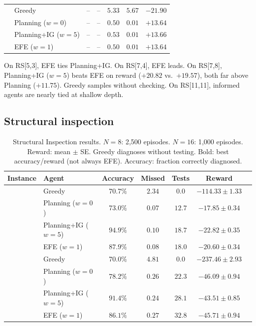 \documentclass[runningheads]{llncs}
\begin{document}
\begin{table}[ht]
\begin{small}
\begin{tabular}{llccccc}
\midrule
{} & Greedy & -- & -- & $5.33$ & $5.67$ & $-21.90$ \\
& Planning ($w{=}0$) & -- & -- & $0.50$ & $0.01$ & $+13.64$ \\
& Planning+IG ($w{=}5$) & -- & -- & $0.53$ & $0.01$ & $\mathbf{+13.66}$ \\
& EFE ($w{=}1$) & -- & -- & $0.50$ & $0.01$ & $+13.64$ \\
\bottomrule
\end{tabular}
\end{small}
\end{table}

On RS[5,3], EFE ties Planning+IG. On RS[7,4], EFE leads. On RS[7,8], Planning+IG ($w{=}5$) beats EFE on reward ($+20.82$ vs.\ $+19.57$), both far above Planning ($+11.75$). Greedy samples without checking. On RS[11,11], informed agents are nearly tied at shallow depth.

\subsection{Structural inspection}
\label{sec:inspection}

\begin{table}[ht]
\centering
\caption{Structural Inspection results. $N{=}8$: 2{,}500 episodes. $N{=}16$: 1{,}000 episodes. Reward: mean $\pm$ SE. Greedy diagnoses without testing. Bold: best accuracy/reward (not always EFE). Accuracy: fraction correctly diagnosed.}
\label{tab:inspection}
\begin{small}
\begin{tabular}{llccccc}
\toprule
Instance & Agent & Accuracy & Missed & Tests & Reward \\
\midrule
{} & Greedy & 70.7\% & $2.34$ & $0.0$ & $-114.33 \pm 1.33$ \\
& Planning ($w{=}0$) & 73.0\% & $0.07$ & $12.7$ & $\mathbf{-17.85 \pm 0.34}$ \\
& Planning+IG ($w{=}5$) & $\mathbf{94.9\%}$ & $0.10$ & $18.7$ & $-22.82 \pm 0.35$ \\
& EFE ($w{=}1$) & $87.9\%$ & $0.08$ & $18.0$ & $-20.60 \pm 0.34$ \\
\midrule
{} & Greedy & 70.0\% & $4.81$ & $0.0$ & $-237.46 \pm 2.93$ \\
& Planning ($w{=}0$) & 78.2\% & $0.26$ & $22.3$ & $-46.09 \pm 0.94$ \\
& Planning+IG ($w{=}5$) & $\mathbf{91.4\%}$ & $0.24$ & $28.1$ & $\mathbf{-43.51 \pm 0.85}$ \\
& EFE ($w{=}1$) & $86.1\%$ & $0.27$ & $32.8$ & $-45.71 \pm 0.94$ \\
\bottomrule
\end{tabular}
\end{small}
\end{table}
\end{document}
